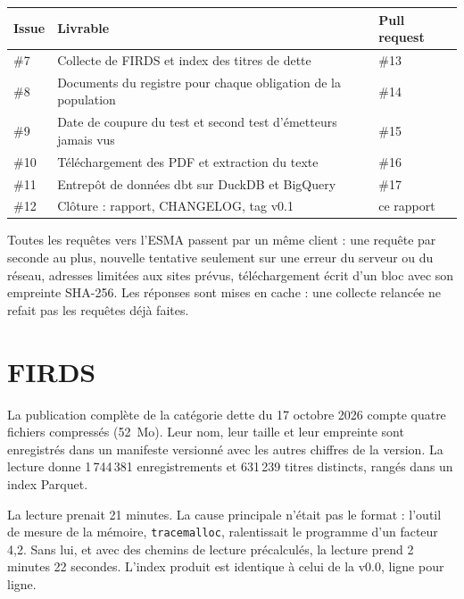 \documentclass[11pt,a4paper]{article}
\begin{document}
\begin{table}[H]
\small
\begin{tabularx}{\linewidth}{lYl}
\toprule
\textbf{Issue} & \textbf{Livrable} & \textbf{Pull request} \\
\midrule
\#7 & Collecte de FIRDS et index des titres de dette & \#13 \\
\#8 & Documents du registre pour chaque obligation de la population & \#14 \\
\#9 & Date de coupure du test et second test d'émetteurs jamais vus & \#15 \\
\#10 & Téléchargement des PDF et extraction du texte & \#16 \\
\#11 & Entrepôt de données dbt sur DuckDB et BigQuery & \#17 \\
\#12 & Clôture : rapport, CHANGELOG, tag v0.1 & ce rapport \\
\bottomrule
\end{tabularx}
\end{table}

Toutes les requêtes vers l'ESMA passent par un même client : une requête par seconde au plus, nouvelle tentative seulement sur une erreur du serveur ou du réseau, adresses limitées aux sites prévus, téléchargement écrit d'un bloc avec son empreinte SHA-256. Les réponses sont mises en cache : une collecte relancée ne refait pas les requêtes déjà faites.

\section{FIRDS}

La publication complète de la catégorie dette du 17 octobre 2026 compte quatre fichiers compressés (52~Mo). Leur nom, leur taille et leur empreinte sont enregistrés dans un manifeste versionné avec les autres chiffres de la version. La lecture donne 1\,744\,381 enregistrements et 631\,239 titres distincts, rangés dans un index Parquet.

La lecture prenait 21 minutes. La cause principale n'était pas le format : l'outil de mesure de la mémoire, \texttt{tracemalloc}, ralentissait le programme d'un facteur 4,2. Sans lui, et avec des chemins de lecture précalculés, la lecture prend 2 minutes 22 secondes. L'index produit est identique à celui de la v0.0, ligne pour ligne.

\end{document}
